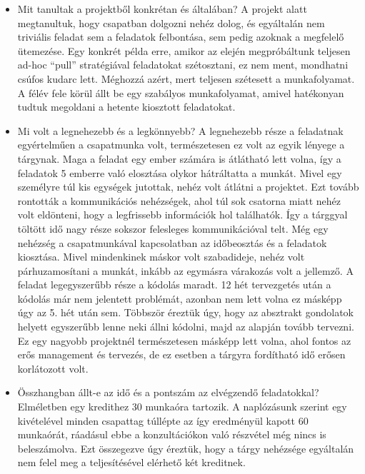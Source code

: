 \begin{itemize}
\item Mit tanultak a projektből konkrétan és általában? \newline
A projekt alatt megtanultuk, hogy csapatban dolgozni nehéz dolog, és egyáltalán nem triviális feladat sem a feladatok felbontása, sem pedig azoknak a megfelelő ütemezése. Egy konkrét példa erre, amikor az elején megpróbáltunk teljesen ad-hoc “pull” stratégiával feladatokat szétosztani, ez nem ment, mondhatni csúfos kudarc lett. Méghozzá azért, mert teljesen szétesett a munkafolyamat. A félév fele körül állt be egy szabályos munkafolyamat, amivel hatékonyan tudtuk megoldani a hetente kiosztott feladatokat.
\item Mi volt a legnehezebb és a legkönnyebb? \newline
A legnehezebb része a feladatnak egyértelműen a csapatmunka volt, természetesen ez volt az egyik lényege a tárgynak. Maga a feladat egy ember számára is átlátható lett volna, így a feladatok 5 emberre való elosztása olykor hátráltatta a munkát. Mivel egy személyre túl kis egységek jutottak, nehéz volt átlátni a projektet. Ezt tovább rontották a kommunikációs nehézségek, ahol túl sok csatorna miatt nehéz volt eldönteni, hogy a legfrissebb információk hol találhatók. Így a tárggyal töltött idő nagy része sokszor felesleges kommunikációval telt. Még egy nehézség a csapatmunkával kapcsolatban az időbeosztás és a feladatok kiosztása. Mivel mindenkinek máskor volt szabadideje, nehéz volt párhuzamosítani a munkát, inkább az egymásra várakozás volt a jellemző.\newline \newline
A feladat legegyszerűbb része a kódolás maradt. 12 hét tervezgetés után a kódolás már nem jelentett problémát, azonban nem lett volna ez másképp úgy az 5. hét után sem. Többször éreztük úgy, hogy az absztrakt gondolatok helyett egyszerűbb lenne neki állni kódolni, majd az alapján tovább tervezni. Ez egy nagyobb projektnél természetesen másképp lett volna, ahol fontos az erős management és tervezés, de ez esetben a tárgyra fordítható idő erősen korlátozott volt.
\item Összhangban állt-e az idő és a pontszám az elvégzendő feladatokkal? \newline
Elméletben egy kredithez 30 munkaóra tartozik. A naplózásunk szerint egy kivételével minden csapattag túllépte az így eredményül kapott 60 munkaórát, ráadásul ebbe a konzultációkon való részvétel még nincs is beleszámolva. 
Ezt összegezve úgy éreztük, hogy a tárgy nehézsége egyáltalán nem felel meg a teljesítésével elérhető két kreditnek.\newline \newline

\end{itemize}
